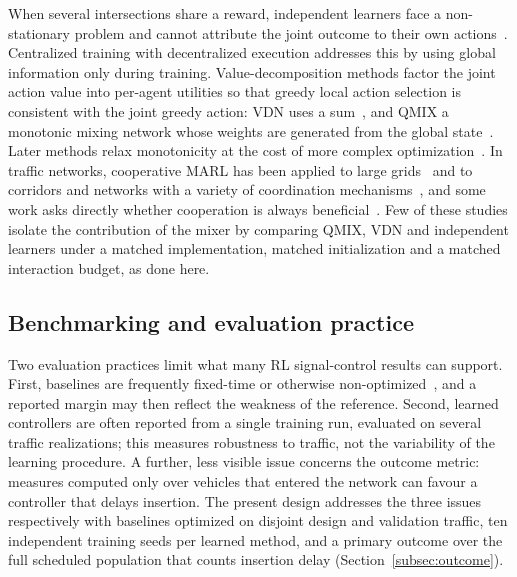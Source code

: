 \documentclass[review,12pt]{elsarticle}
\begin{document}
When several intersections share a reward, independent learners face
a non-stationary problem and cannot attribute the joint outcome to their
own actions~\cite{foerster2018counterfactual}.
Centralized training with decentralized execution addresses this by
using global information only during training. Value-decomposition
methods factor the joint action value into per-agent utilities so that
greedy local action selection is consistent with the joint greedy
action: VDN uses a sum~\cite{sunehag2017value}, and QMIX a monotonic
mixing network whose weights are generated from the global
state~\cite{Rashid2018}. Later methods relax monotonicity at the cost of
more complex optimization~\cite{son2019qtran,rashid2020weighted,wang2021qplex}.
In traffic networks, cooperative MARL has been applied to large
grids~\cite{chu2019multi} and to corridors and networks with a variety
of coordination mechanisms~\cite{zhang2022distributed,kolat2023multi,jia2025multi},
and some work asks directly whether cooperation is always
beneficial~\cite{ren2025cooperative}. Few of these studies isolate the
contribution of the mixer by comparing QMIX, VDN and independent
learners under a matched implementation, matched initialization and a
matched interaction budget, as done here.

\subsection{Benchmarking and evaluation practice}
\label{subsec:lit_benchmarking}

Two evaluation practices limit what many RL signal-control results can
support. First, baselines are frequently fixed-time or otherwise
non-optimized~\cite{noaeen2022reinforcement}, and a reported margin
may then reflect the weakness of the reference.
Second, learned controllers are often
reported from a single training run, evaluated on several traffic
realizations; this measures robustness to traffic, not the variability
of the learning procedure.
A further, less visible issue concerns the outcome metric: measures
computed only over vehicles that entered the network can favour a
controller that delays insertion. The present design addresses the
three issues respectively with baselines optimized on disjoint design
and validation traffic, ten independent training seeds per learned
method, and a primary outcome over the full scheduled population that
counts insertion delay (Section~\ref{subsec:outcome}).
\end{document}
